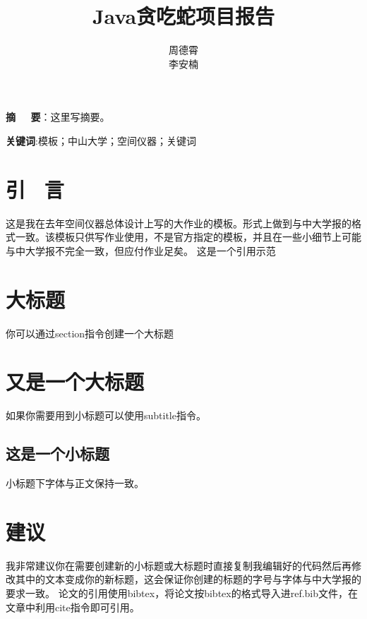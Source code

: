 \documentclass{article}
\title{\zihao{2}\songti \textbf{Java贪吃蛇项目报告}}
\author{\zihao{-4}\kaishu 周德霄 \\ \zihao{-4}\kaishu 李安楠}
\date{}
\begin{document}
\maketitle
\thispagestyle{mystyle}
\noindent
{}\songti \textbf{摘 \ \ 要}：这里写摘要。

\noindent
\textbf{关键词}:模板；中山大学；空间仪器；关键词
\setlength\columnsep{0.8cm} %
\begin{multicols}{2} %


\section{\kaishu 引 \ 言}
\songti 这是我在去年空间仪器总体设计上写的大作业的模板。形式上做到与中大学报的格式一致。该模板只供写作业使用，不是官方指定的模板，并且在一些小细节上可能与中大学报不完全一致，但应付作业足矣。 这是一个引用示范\cite{1998Gravitational}


\section{\kaishu 大标题}
你可以通过section指令创建一个大标题


\section{\kaishu 又是一个大标题}
如果你需要用到小标题可以使用subtitle指令。

\subsection{\songti 这是一个小标题}
小标题下字体与正文保持一致。

\section{\kaishu 建议}
我非常建议你在需要创建新的小标题或大标题时直接复制我编辑好的代码然后再修改其中的文本变成你的新标题，这会保证你创建的标题的字号与字体与中大学报的要求一致。
论文的引用使用bibtex，将论文按bibtex的格式导入进ref.bib文件，在文章中利用cite指令即可引用。
\end{multicols} %

\end{document}
